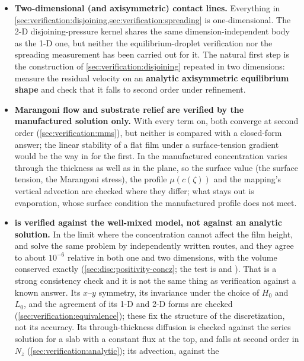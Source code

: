 \begin{itemize}
  \item \textbf{Two-dimensional (and axisymmetric) contact lines.} Everything in
    \cref{sec:verification:disjoining,sec:verification:spreading} is
    one-dimensional. The 2-D disjoining-pressure kernel shares the same
    dimension-independent body as the 1-D one, but neither the
    equilibrium-droplet verification nor the spreading measurement has been
    carried out for it. The natural first step is the construction of
    \cref{sec:verification:disjoining} repeated in two dimensions: measure the
    residual velocity on an \textbf{analytic axisymmetric equilibrium shape}
    and check that it falls to second order under refinement.
  \item \textbf{Marangoni flow and substrate relief are verified by the
    manufactured solution only.} With every term on, both converge at second
    order (\cref{sec:verification:mms}), but neither is compared with a
    closed-form answer; the linear stability of a flat film under a
    surface-tension gradient would be the way in for the first. In
     the manufactured concentration varies through the thickness
    as well as in the plane, so the surface value (the surface tension, the
    Marangoni stress), the profile $\mu(c(\zeta))$ and the mapping's vertical
    advection are checked where they differ; what stays out is evaporation,
    whose surface condition the manufactured profile does not meet.
  \item \textbf{ is verified against the well-mixed model, not
    against an analytic solution.} In the limit where the concentration cannot
    affect the film height,  and  solve the same problem by
    independently written routes, and they agree to about $10^{-6}$ relative in
    both one and two dimensions, with the volume conserved exactly
    (\cref{sec:disc:positivity-concz}; the test is  and
    ). That is a strong consistency check and it is not
    the same thing as verification against a known answer. Its $x$--$y$
    symmetry, its invariance under the choice of $H_0$ and $L_0$, and the
    agreement of its 1-D and 2-D forms are checked
    (\cref{sec:verification:equivalence}); these fix the structure of the
    discretization, not its accuracy. Its through-thickness diffusion is
    checked against the series solution for a slab with a constant flux at the
    top, and falls at second order in $N_z$
    (\cref{sec:verification:analytic}); its advection, against the

\end{itemize}
